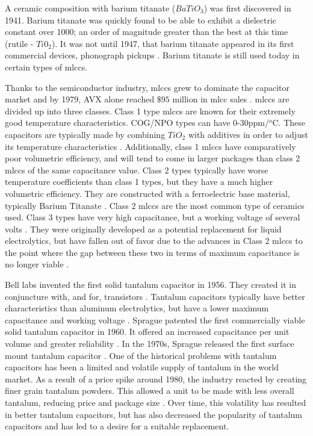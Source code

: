 A ceramic composition with barium titanate ($BaTiO_3$) was first discovered in 1941. Barium titanate was quickly found to be able to exhibit a dielectric constant over 1000; an order of magnitude greater than the best at this time (rutile - $Ti0_2$). It was not until 1947, that barium titanate appeared in its first commercial devices, phonograph pickups \cite{piezCer}\cite{hist_cerFilt}\cite[Ch 3 Sec III]{cerMaterials}. Barium titanate is still used today in certain types of \glspl{mlcc}.

Thanks to the semiconductor industry, \glspl{mlcc} grew to dominate the capacitor market and by 1979, AVX alone reached $\$95$ million in \gls{mlcc} sales \cite{avx_hist}.
\glspl{mlcc} are divided up into three classes. Class 1 type \glspl{mlcc} are known for their extremely good temperature characteristics. COG/NPO types can have 0-30ppm/$^o$C. These capacitors are typically made by combining $TiO_2$ with additives in order to adjust its temperature characteristics \cite{intro_cerCaps}. Additionally, class 1 \glspl{mlcc} have comparatively poor volumetric efficiency, and will tend to come in larger packages than class 2 \glspl{mlcc} of the same capacitance value. Class 2 types typically have worse temperature coefficients than class 1 types, but they have a much higher volumetric efficiency. They are constructed with a ferroelectric base material, typically Barium Titanate \cite{intro_cerCaps}. Class 2 \glspl{mlcc} are the most common type of ceramics used. Class 3 types have very high capacitance, but a working voltage of several volts \cite{hist_cerFilt}\cite[Ch 3 Sec VI]{cerMaterials}\cite{atCer_tempco}. They were originally developed as a potential replacement for liquid electrolytics, but have fallen out of favor due to the advances in Class 2 \glspl{mlcc} to the point where the gap between these two in terms of maximum capacitance is no longer viable \cite{wiki_cer}.

Bell labs invented the first solid tantalum capacitor in 1956. They created it in conjuncture with, and for, transistors \cite[f.~56-64]{dumInv}. Tantalum capacitors typically have better characteristics than aluminum electrolytics, but have a lower maximum capacitance and working voltage \cite{learn_caps}.
Sprague patented the first commercially viable solid tantalum capacitor in 1960. It offered an increased capacitance per unit volume and greater reliability \cite{charTant}. In the 1970s, Sprague released the first surface mount tantalum capacitor \cite{spragueHist}.
One of the historical problems with tantalum capacitors has been a limited and volatile supply of tantalum in the world market.
As a result of a price spike around 1980, the industry reacted by creating finer grain tantalum powders. This allowed a unit to be made with less overall tantalum, reducing price and package size \cite[ch~3.1]{tantMis}. Over time, this volatility has resulted in better tantalum capacitors, but has also decreased the popularity of tantalum capacitors and has led to a desire for a suitable replacement.

